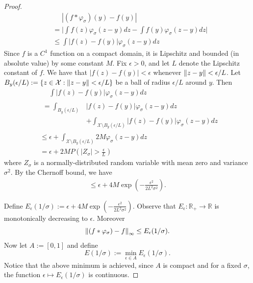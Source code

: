 \begin{proof}
    \begin{align*}
        & \phantom{=}|(f \ast \varphi_\sigma)(y) -f(y)| 
        \\&= \bigg| \int f(z)  \varphi_\sigma(z-y) dz - \int f(y) \varphi_\sigma(z-y) dz \bigg|
        \\&\leq  \int |f(z) -f(y)| \varphi_\sigma(z-y) dz
    \end{align*}
    Since $f$ is  a $C^1$ function on a compact domain, it is Lipschitz and bounded (in absolute value) by some constant $M$. 
    Fix $\epsilon > 0$, and let $L$ denote the Lipschitz constant of $f$.
    We have that $|f(z) -f(y)| < \epsilon$ whenever $\left\lVert z-y \right\rVert < \epsilon / L$.
    Let $B_y( \epsilon / L ) := \{z \in \mathcal{X} : \left\lVert z-y \right\rVert < \epsilon / L \}$ be a ball of radius $\epsilon / L$ around $y$.
    Then
    \begin{align*}
        &\phantom{=}\int |f(z) -f(y)| \varphi_\sigma(z-y) dz 
        \\ &\! \begin{aligned}
            = \int_{B_y( \epsilon / L )}& |f(z) -f(y)| \varphi_\sigma(z-y) dz 
            \\ &+ \int_{\mathcal{X} \setminus B_y( \epsilon / L )} |f(z) -f(y)| \varphi_\sigma(z-y) dz
        \end{aligned}
        \\ &\leq \epsilon +  \int_{\mathcal{X} \setminus B_y( \epsilon / L )}  2M \varphi_\sigma(z-y) dz
       \\ &= \epsilon +  2M P \left( |Z_\sigma| > \frac{\epsilon}{L} \right)
    \end{align*}
    where $Z_\sigma$ is a normally-distributed random variable with mean zero and variance $\sigma^2$.
    By the Chernoff bound, we have
    \begin{align*}
        \leq  \epsilon +  4M \exp \left( -\frac{\epsilon^2}{2L^2 \sigma^2}\right).
    \end{align*}
    
    \noindent Define $E_\epsilon(1/\sigma) :=   \epsilon +  4M \exp \left( -\frac{\epsilon^2}{2L^2 \sigma^2}\right)$. Observe that $E_\epsilon: \mathbb{R}_+ \xrightarrow{} \mathbb{R}$ is monotonically decreasing to $\epsilon$.
    Moreover 
    $$ \left\lVert (f \ast \varphi_\sigma) - f \right\rVert_{\infty} \leq E_{\epsilon}(1/\sigma). $$
    Now let $A := [0,1]$ and define 
    $$E(1/\sigma) := \min_{\epsilon \in A} E_\epsilon(1/\sigma).$$
    Notice that the above minimum is achieved, since $A$ is compact and for a fixed $\sigma$, the function $\epsilon \mapsto E_{\epsilon}(1/\sigma)$ is continuous.


\end{proof}
